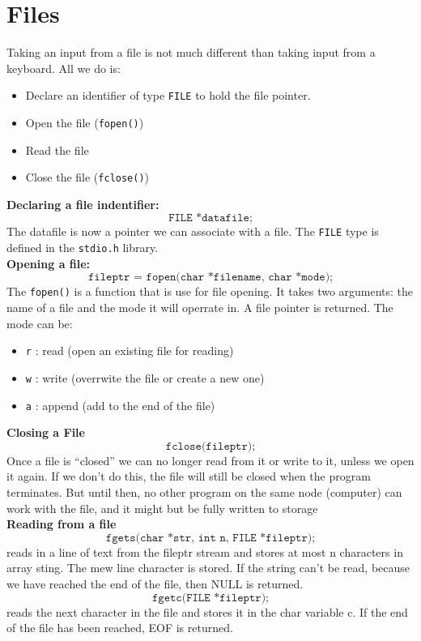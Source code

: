 \documentclass[a4paper, 10pt]{article}
\begin{document}
\section{Files}
Taking an input from a file is not much different than taking input from a keyboard. All we do is:
\begin{itemize}
    \item Declare an identifier of type \texttt{FILE} to hold the file pointer.
    \item Open the file (\texttt{fopen()})
    \item Read the file
    \item Close the file (\texttt{fclose()})
\end{itemize}
\textbf{Declaring a file indentifier:}
$$\texttt{FILE *datafile;}$$
The datafile is now a pointer we can associate with a file. The \texttt{FILE} type is defined in the \texttt{stdio.h} library. \\[2ex]
\textbf{Opening a file:}
$$\texttt{fileptr = fopen(char *filename, char *mode);}$$
The \texttt{fopen()} is a function that is use for file opening. It takes two arguments: the name of a file and the mode it will operrate in. A file pointer is returned. The mode can be:
\begin{itemize}
    \item \texttt{r} : read (open an existing file for reading)
    \item \texttt{w} : write (overrwite the file or create a new one)
    \item \texttt{a} : append (add to the end of the file)
\end{itemize}\vspace{1em}
\textbf{Closing a File}
$$\texttt{fclose(fileptr);}$$
Once a file is “closed” we can no longer read from it or write to it, unless
we open it again. If we don’t do this, the file will still be closed when the
program terminates. But until then, no other program on the same node
(computer) can work with the file, and it might but be fully written to
storage\\[2ex]
\textbf{Reading from a file}
$$\texttt{fgets(char *str, int n, FILE *fileptr);}$$
reads in a line of text from the fileptr stream and stores at most n
characters in array sting. The mew line character is stored.
If the string can’t be read, because we have reached the end of the file,
then NULL is returned.
$$\texttt{fgetc(FILE *fileptr);}$$
reads the next character in the file and stores it in the char variable c. If
the end of the file has been reached, EOF is returned.
\end{document}
